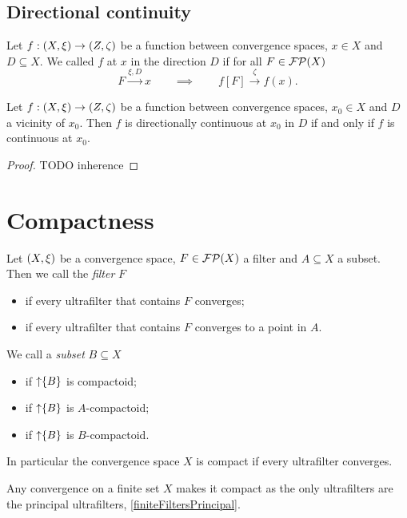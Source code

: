 \subsection{Directional continuity}
\begin{definition}
Let $f: \sSet{X,\xi} \to \sSet{Z,\zeta}$ be a function between convergence spaces, $x\in X$ and $D\subseteq X$. We called $f$  at $x$ in the direction $D$ if for all $F\in\operatorname{\mathcal{FP}}(X)$
\[ F \overset{\xi,D}{\longrightarrow} x \qquad \implies \qquad f[F] \overset{\zeta}{\longrightarrow} f(x). \]
\end{definition}

\begin{lemma}
Let $f: \sSet{X,\xi} \to \sSet{Z,\zeta}$ be a function between convergence spaces, $x_0\in X$ and $D$ a vicinity of $x_0$. Then $f$ is directionally continuous at $x_0$ in $D$ \textup{if and only if} $f$ is continuous at $x_0$.
\end{lemma}
\begin{proof}
TODO inherence
\end{proof}

\section{Compactness}
\begin{definition}
Let $\sSet{X,\xi}$ be a convergence space, $F\in\operatorname{\mathcal{FP}}(X)$ a filter and $A\subseteq X$ a subset. Then we call the \emph{filter} $F$
\begin{itemize}
\item {} if every ultrafilter that contains $F$ converges;
\item {} if every ultrafilter that contains $F$ converges to a point in $A$.
\end{itemize}
We call a \emph{subset} $B\subseteq X$
\begin{itemize}
\item {} if $\operatorname{\uparrow}\{B\}$ is compactoid;
\item {} if $\operatorname{\uparrow}\{B\}$ is $A$-compactoid;
\item {} if $\operatorname{\uparrow}\{B\}$ is $B$-compactoid.
\end{itemize}
\end{definition}
In particular the convergence space $X$ is compact if every ultrafilter converges.

\begin{example}
Any convergence on a finite set $X$ makes it compact as the only ultrafilters are the principal ultrafilters, \ref{finiteFiltersPrincipal}.
\end{example}

